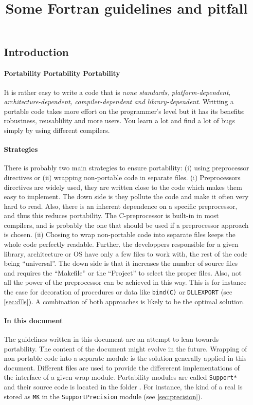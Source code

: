 \documentclass{article}
\title{Some Fortran guidelines and pitfall}
\begin{document}
\maketitle

\tableofcontents

\subsection*{Introduction}
\paragraph{Portability Portability Portability}
It is rather easy to write a code that is \textit{none standards, platform-dependent, architecture-dependent, compiler-dependent and library-dependent}.
Writting a portable code takes more effort on the programmer's level but it has its benefits: robustness, reusablility and more users. You learn a lot and find a lot of bugs simply by using different compilers.

\paragraph{Strategies}
There is probably two main strategies to ensure portability: (i) using preprocessor directives or (ii) wrapping non-portable code in separate files.
(i) Preprocessors directives are widely used, they are written close to the code which makes them easy to implement. The down side is they pollute the code and make it often very hard to read. Also, there is an inherent dependence on a specific preprocessor, and thus this reduces portability. The C-preprocessor is built-in in most compilers, and is probably the one that should be used if a preprocessor approach is chosen. 
(ii) Chosing to wrap non-portable code into separate files keeps the whole code perfectly readable. Further, the developpers responsible for a given library, architecture or OS have only a few files to work with, the rest of the code being ``universal''.
The down side is that it increases the number of source files and requires the ``Makefile'' or the ``Project'' to select the proper files. 
Also, not all the power of the preprocessor can be achieved in this way.
This is for instance the case for decoration of procedures or data like \texttt{bind(C)} or \texttt{DLLEXPORT} (see \autoref{sec:dlls}).
A combination of both approaches is likely to be the optimal solution.

\paragraph{In this document}
The guidelines written in this document are an attempt to lean towards portability. The content of the document might evolve in the future.
Wrapping of non-portable code into a separate module is the solution generally applied in this document. Different files are used to provide the differerent implementations of the interface of a given wrap-module.  Portability modules are called \verb|Support*| and their source code is located in the folder .
For instance, the kind of a real is stored as \verb|MK| in the \verb|SupportPrecision| module (see \autoref{sec:precision}).
\end{document}
